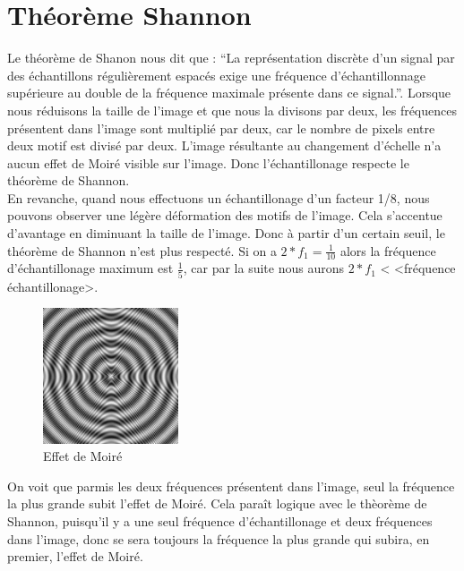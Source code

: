 \documentclass[a4paper,11pt]{article}
\begin{document}
  \section{Théorème Shannon}
  Le théorème de Shanon nous dit que : \enquote{La représentation discrète d'un signal par des échantillons régulièrement espacés exige une fréquence d'échantillonnage 
  supérieure au double de la fréquence maximale présente dans ce signal.}. Lorsque nous réduisons la taille de l’image et que nous la divisons par deux, les fréquences 
  présentent dans l’image sont multiplié par deux, car le nombre de pixels entre deux motif est divisé par deux. L’image résultante au changement d’échelle n’a aucun effet 
  de Moiré visible sur l’image. Donc l’échantillonage respecte le théorème de Shannon.\\
  
  En revanche, quand nous effectuons un échantillonage d’un facteur 1/8, nous pouvons observer une légère déformation des motifs de l’image. Cela s’accentue 
  d’avantage en diminuant la taille de l’image. Donc à partir d’un certain seuil, le théorème de Shannon n’est plus respecté. 
  Si on a $2*f_1=\frac{1}{10}$ alors la fréquence d'échantillonage maximum est $\frac{1}{5}$, car par la suite nous aurons $2*f_1$ < <fréquence échantillonage>.\\
  
  \begin{figure}[H]
   \centering
   \includegraphics[width=4cm]{../128_moire.png}
   \caption{Effet de Moiré}
  \end{figure}


  On voit que parmis les deux fréquences présentent dans l’image, seul la fréquence la plus grande subit l’effet de Moiré. Cela paraît logique avec le thèorème de Shannon, 
  puisqu’il y a une seul fréquence d’échantillonage et deux fréquences dans l’image, donc se sera toujours la fréquence la plus grande qui subira, en premier, l’effet de Moiré.\\
\end{document}
